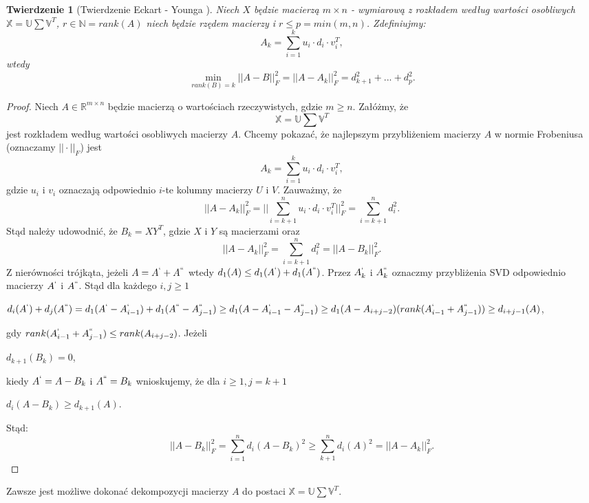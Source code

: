 \documentclass[12pt,a4paper]{report}
\newtheorem{tw}[df]{Twierdzenie}
\newcommand{\setR}{\mathbb{R}}
\newcommand{\setN}{\mathbb{N}}
\begin{document}
\begin{tw}[Twierdzenie Eckart - Younga {\citep{ulafiir}}]%
Niech $X$ będzie macierzą $m \times n$ - wymiarową z rozkładem według wartości osobliwych $\mathbb{X}=\mathbb{U}\sum \mathbb{V}^T$, $r\in \setN = rank(A)$ niech będzie rzędem macierzy i $r\leq p = min(m,n)$.
Zdefiniujmy:
$$A_k = \sum_{i=1}^k u_i\cdot d_i \cdot v_i^T,$$
wtedy
$$
\min \limits_{rank(B) = k } ||A - B||_F^2 = ||A - A_k||_F^2 = d_{k+1}^2 + ... + d_p^2.
$$
\end{tw}
\begin{proof}
Niech $A \in \setR^{m\times n}$ będzie macierzą o wartościach rzeczywistych, gdzie $m\geq n$.
Załóżmy, że
$$
\mathbb{X}=\mathbb{U}\sum \mathbb{V}^T
$$
jest rozkładem według wartości osobliwych macierzy $A$.
Chcemy pokazać, że najlepszym przybliżeniem macierzy $A$ w normie Frobeniusa (oznaczamy $||\cdot||_F$) jest
$$
A_k = \sum_{i=1}^k u_i\cdot d_i \cdot v_i^T,
$$
gdzie $u_i$ i $v_i$ oznaczają odpowiednio $i$-te kolumny macierzy $U$ i $V$.
Zauważmy, że
$$
||A - A_k||_F^2 = ||\sum_{i=k+1}^n u_i \cdot d_i \cdot v_i^T||_F^2 = \sum_{i=k+1}^n d_i^2.
$$
Stąd należy udowodnić, że $B_k = XY^T$, gdzie $X$ i $Y$ są macierzami oraz 
$$
||A - A_k||_F^2 = \sum_{i=k+1}^n d_i^2 = ||A - B_k||_F^2.
$$
Z nierówności trójkąta, jeżeli $A = A^{`} + A^{``}$ wtedy $d_1(A)\leq d_1(A^{`}) + d_1(A^{``})$. 
Przez $A_k^{`}$ i $A_k^{``}$ oznaczmy przybliżenia SVD odpowiednio macierzy $A^{`}$ i $A^{``}$. 
Stąd dla każdego $i,j \geq 1$
\begin{center}
$d_i(A^{`}) + d_j(A^{``}) = d_1(A^{`} - A_{i-1}^{`}) + d_1(A^{``} - A_{j-1}^{``})
\geq d_1(A-A_{i-1}^{`} - A_{j-1}^{``})
\geq d_1(A-A_{i+j-2})(rank(A_{i-1}^{`} + A_{j-1}^{``}))
\geq d_{i+j-1}(A)$,
\end{center}
gdy $rank(A_{i-1}^{`} + A_{j-1}^{``}) \leq rank (A_{i+j-2})$.
Jeżeli 
\begin{center}
$d_{k+1}(B_k)=0$,
\end{center} 
kiedy $A^{`} = A - B_k$ i $A^{``} = B_k$ wnioskujemy, że dla $i\geq 1, j= k+1$
\begin{center}
$d_i(A-B_k)\geq d_{k+1}(A)$.
\end{center}
Stąd:
$$||A - B_k||_F^2 = \sum_{i=1}^n d_i(A-B_k)^2\geq \sum_{k+1}^nd_i(A)^2 = ||A-A_k||_F^2.$$
\end{proof}

Zawsze jest możliwe dokonać dekompozycji macierzy $A$ do postaci $\mathbb{X}=\mathbb{U}\sum \mathbb{V}^T$.
\end{document}

